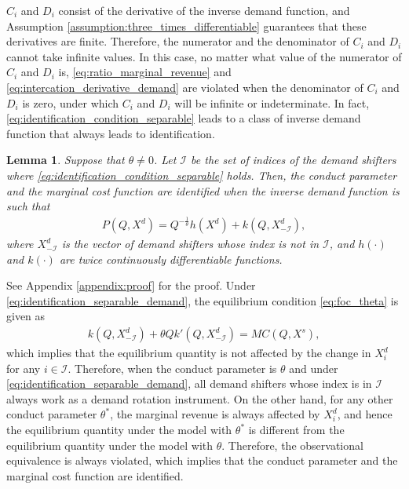 \documentclass[11pt, a4paper]{article}
\newtheorem{lemma}{Lemma}
\theoremstyle{remark}
\begin{document}
$C_i$ and $D_i$ consist of the derivative of the inverse demand function, and Assumption \ref{assumption:three_times_differentiable} guarantees that these derivatives are finite.
Therefore, the numerator and the denominator of $C_i$ and $D_i$ cannot take infinite values.
In this case, no matter what value of the numerator of $C_i$ and $D_i$ is, \eqref{eq:ratio_marginal_revenue} and \eqref{eq:intercation_derivative_demand} are violated when the denominator of $C_i$ and $D_i$ is zero, under which $C_i$ and $D_i$ will be infinite or indeterminate.
In fact, \eqref{eq:identification_condition_separable} leads to a class of inverse demand function that always leads to identification.
\begin{lemma}\label{lemma:identification_condition_separable}
    Suppose that $\theta \ne 0$.  
    Let $\mathcal{I}$ be the set of indices of the demand shifters where \eqref{eq:identification_condition_separable} holds.
    Then, the conduct parameter and the marginal cost function are identified when the inverse demand function is such that
    \begin{align}
        P(Q, X^{d}) = Q^{-\frac{1}{\theta}}h(X^{d}) + k(Q, X^{d}_{-\mathcal{I}}), \label{eq:identification_separable_demand}
    \end{align}
    where $X^{d}_{-\mathcal{I}}$ is the vector of demand shifters whose index is not in $\mathcal{I}$, and $h(\cdot)$ and $k(\cdot)$ are twice continuously differentiable functions.
\end{lemma}
See Appendix \ref{appendix:proof} for the proof.
Under \eqref{eq:identification_separable_demand}, the equilibrium condition \eqref{eq:foc_theta} is given as
\begin{align}
    k(Q, X^{d}_{-\mathcal{I}}) + \theta Qk'(Q, X^{d}_{-\mathcal{I}}) = MC(Q, X^{s}),
\end{align}
which implies that the equilibrium quantity is not affected by the change in $X^{d}_i$ for any $i \in \mathcal{I}$.
Therefore, when the conduct parameter is $\theta$ and under \eqref{eq:identification_separable_demand}, all demand shifters whose index is in $\mathcal{I}$ always work as a demand rotation instrument.
On the other hand, for any other conduct parameter $\theta^{*}$, the marginal revenue is always affected by $X^{d}_i$, and hence the equilibrium quantity under the model with $\theta^{*}$ is different from the equilibrium quantity under the model with $\theta$.
Therefore, the observational equivalence is always violated, which implies that the conduct parameter and the marginal cost function are identified.
\end{document}
